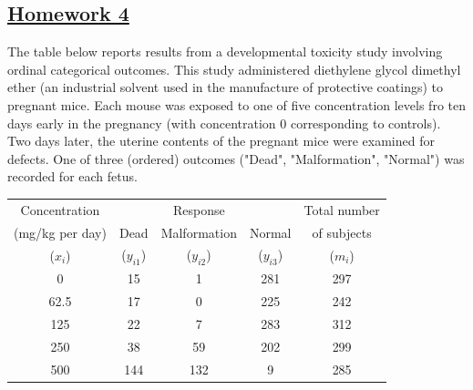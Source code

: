 \documentclass[]{article}
\begin{document}
\renewcommand{\headrulewidth}{0.4pt}
\renewcommand{\footrulewidth}{0.4pt}


\begin{center}
\section*{\underline{Homework 4}}
\end{center}

\begin{enumerate}  \Large{
		\item[Ex1] The table below reports results from a developmental toxicity study involving ordinal categorical outcomes. This study administered diethylene glycol dimethyl ether (an industrial solvent used in the manufacture of protective coatings) to pregnant mice. Each mouse was exposed to one of five concentration levels fro ten days early in the pregnancy (with concentration 0 corresponding to controls). Two days later, the uterine contents of the pregnant mice were examined for defects. One of three (ordered) outcomes ("Dead", "Malformation", "Normal") was recorded for each fetus.
		\begin{table}[ht!]
			\centering
			\begin{tabular}{c|c c c|c}
				\hline
				Concentration    &          & Response       &                & Total number  \\
				(mg/kg per day) & Dead & Malformation & Normal   & of subjects      \\
				($x_i$)               & ($y_{i1}$) & ($y_{i2}$) & ($y_{i3}$) & ($m_i$)           \\
				\hline
				0                       & 15      & 1                    & 281         & 297                 \\
				62.5                  & 17      & 0                    & 225         & 242                 \\
				125                   & 22      & 7                    & 283         & 312                 \\
				250                   & 38      & 59                  & 202         & 299                 \\
				500                   & 144     & 132               & 9             & 285                 \\
				\hline
			\end{tabular}

\end{table}}
\end{enumerate}
\end{document}
